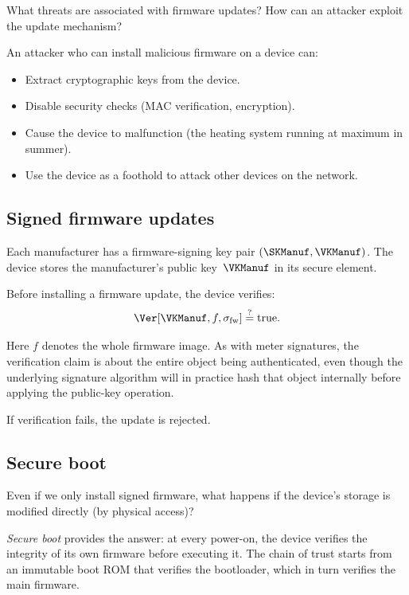 \begin{exercise}
  What threats are associated with firmware updates?
  How can an attacker exploit the update mechanism?
\end{exercise}

An attacker who can install malicious firmware on a device can:
\begin{itemize}
  \item Extract cryptographic keys from the device.
  \item Disable security checks (MAC verification, encryption).
  \item Cause the device to malfunction (\eg the heating system running
    at maximum in summer).
  \item Use the device as a foothold to attack other devices on the
    network.
\end{itemize}

\subsection{Signed firmware updates}

Each manufacturer has a firmware-signing key pair
\((\SKManuf, \VKManuf)\).
The device stores the manufacturer's public key~\(\VKManuf\) in its secure
element.

Before installing a firmware update, the device verifies:
\[
  \Ver[\VKManuf, f, \sigma_{\text{fw}}]
  \stackrel{?}{=} \text{true}.
\]

Here \(f\) denotes the whole firmware image.
As with meter signatures, the verification claim is about the entire object
being authenticated, even though the underlying signature algorithm will in
practice hash that object internally before applying the public-key operation.

If verification fails, the update is rejected.

\subsection{Secure boot}

\begin{exercise}
  Even if we only install signed firmware, what happens if the device's
  storage is modified directly (by physical access)?
\end{exercise}

\emph{Secure boot} provides the answer: at every power-on, the device
verifies the integrity of its own firmware before executing it.
The chain of trust starts from an immutable boot ROM that verifies the
bootloader, which in turn verifies the main firmware.

